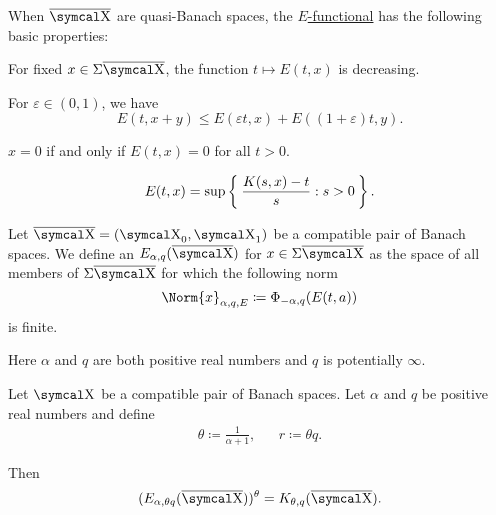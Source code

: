 \begin{proposition}\label{thm:e_functional_properties}
  When \( \Ol{\CX} \) are quasi-Banach spaces, the \hyperref[def:e_functional]{\( E \)-functional} has the following basic properties:

  \begin{PropEnum}
     For fixed \( x \in \Sigma\Ol{\CX} \), the function \( t \mapsto E(t, x) \) is decreasing.

     For \( \varepsilon \in (0, 1) \), we have
    \begin{equation*}
      E(t, x + y) \leq E(\varepsilon t, x) + E((1 + \varepsilon) t, y).
    \end{equation*}

     \( x = 0 \) if and only if \( E(t, x) = 0 \) for all \( t > 0 \).

    \begin{equation*}
      E(t, x) = \sup \Set{ \frac {K(s, x) - t} s : s > 0 }.
    \end{equation*}
  \end{PropEnum}
\end{proposition}

\begin{definition}\label{def:approximation_space}
  Let \( \Ol{\CX} = (\CX_0, \CX_1) \) be a compatible pair of Banach spaces. We define an  \( E_{\alpha,q}(\Ol{\CX}) \) for \( x \in \Sigma\Ol{\CX} \) as the space of all members of \( \Sigma\Ol{\CX} \) for which the following norm
  \begin{equation}\label{eq:def:approximation_space/norm}
    \Norm{x}_{\alpha,q,E} \coloneqq \Phi_{-\alpha,q}(E(t,a))
  \end{equation}
  is finite.

  Here \( \alpha \) and \( q \) are both positive real numbers and \( q \) is potentially \( \infty \).
\end{definition}

\begin{theorem}\label{thm:interpolation_space_and_approximation_space}
  Let \( \CX \) be a compatible pair of Banach spaces. Let \( \alpha \) and \( q \) be positive real numbers and define
  \begin{align*}
    \theta \coloneqq \frac 1 {\alpha + 1},
    &&
    r \coloneqq \theta q.
  \end{align*}

  Then
  \begin{equation*}
    (E_{\alpha,\theta q}(\Ol{\CX}))^\theta = K_{\theta,q}(\Ol{\CX}).
  \end{equation*}
\end{theorem}

